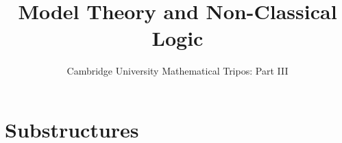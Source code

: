 \documentclass{article}
\title{Model Theory and Non-Classical Logic}
\author{Cambridge University Mathematical Tripos: Part III}
\begin{document}
\maketitle

\tableofcontentsnewpage{}

\section{Substructures}

\end{document}
